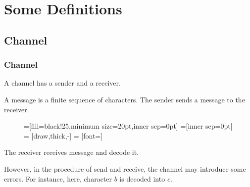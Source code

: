 \section{Some Definitions}

\subsection{Channel}

      \begin{frame}
            \frametitle{Channel}
            \begin{definition}[channel]
                  A channel has a sender and a receiver.
                  \pause


                  A message is a finite sequence of characters.
                  The sender sends a message to the receiver.
                  \begin{figure}[h!]
                        =[fill=black!25,minimum size=20pt,inner sep=0pt]
                        =[inner sep=0pt]
                         = [draw,thick,-]
                         = [font=\small]
                  \end{figure}
                  \pause
                  
                  The receiver receives message and decode it.
                  \pause

                  However, in the procedure of send and receive, the channel may introduce some errors. For instance, here, character $b$ is decoded into $c$. 
            \end{definition}
      \end{frame}

